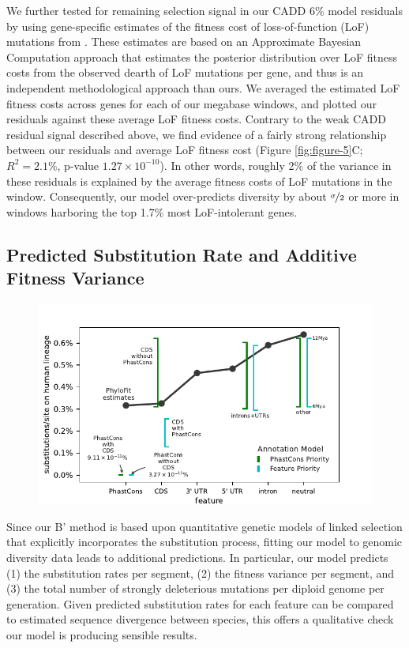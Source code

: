 \documentclass[11pt]{article}
\begin{document}
We further tested for remaining selection signal in our CADD 6\% model
residuals by using gene-specific estimates of the fitness cost of
loss-of-function (LoF) mutations from \textcite{Agarwal2023-un}. These
estimates are based on an Approximate Bayesian Computation approach that
estimates the posterior distribution over LoF fitness costs from the observed
dearth of LoF mutations per gene, and thus is an independent methodological
approach than ours. We averaged the estimated LoF fitness costs across genes
for each of our megabase windows, and plotted our residuals against these
average LoF fitness costs. Contrary to the weak CADD residual signal described
above, we find evidence of a fairly strong relationship between our residuals
and average LoF fitness cost (Figure \ref{fig:figure-5}C; $R^2 = 2.1\%$,
p-value $1.27 \times 10^{-10}$). In other words, roughly 2\% of the variance in
these residuals is explained by the average fitness costs of LoF mutations in
the window. Consequently, our model over-predicts diversity by about
$\nicefrac{\sigma}{2}$ or more in windows harboring the top 1.7\% most
LoF-intolerant genes.

\subsection*{Predicted Substitution Rate and Additive Fitness Variance}

\begin{figure}[htbp] \centering
    \includegraphics[width=\textwidth]{figures/figure_7.pdf} 

    \caption{}

  \label{fig:figure-6}
\end{figure}

Since our B' method is based upon quantitative genetic models of linked
selection that explicitly incorporates the substitution process, fitting our
model to genomic diversity data leads to additional predictions. In particular,
our model predicts (1) the substitution rates per segment, (2) the fitness
variance per segment, and (3) the total number of strongly deleterious
mutations per diploid genome per generation. Given predicted substitution rates
for each feature can be compared to estimated sequence divergence between
species, this offers a qualitative check our model is producing sensible
results. 
\end{document}
